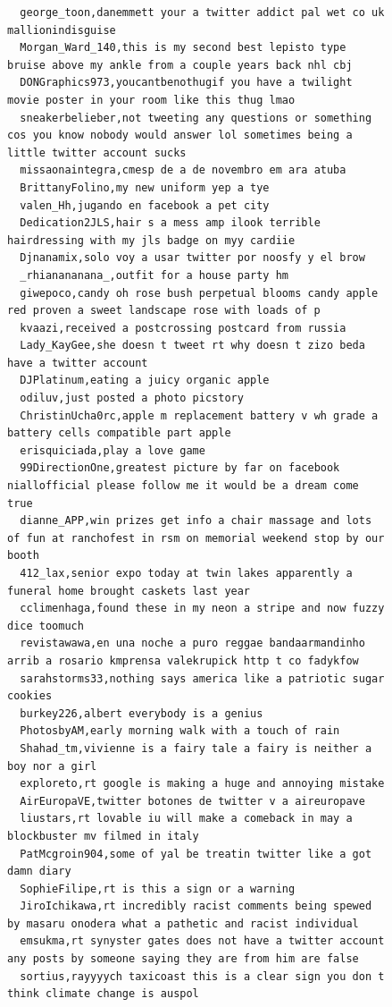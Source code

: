 \begin{figure}[htpb]
\begin{verbatim}
  george_toon,danemmett your a twitter addict pal wet co uk mallionindisguise
  Morgan_Ward_140,this is my second best lepisto type bruise above my ankle from a couple years back nhl cbj
  DONGraphics973,youcantbenothugif you have a twilight movie poster in your room like this thug lmao
  sneakerbelieber,not tweeting any questions or something cos you know nobody would answer lol sometimes being a little twitter account sucks
  missaonaintegra,cmesp de a de novembro em ara atuba
  BrittanyFolino,my new uniform yep a tye
  valen_Hh,jugando en facebook a pet city
  Dedication2JLS,hair s a mess amp ilook terrible hairdressing with my jls badge on myy cardiie
  Djnanamix,solo voy a usar twitter por noosfy y el brow
  _rhianananana_,outfit for a house party hm
  giwepoco,candy oh rose bush perpetual blooms candy apple red proven a sweet landscape rose with loads of p
  kvaazi,received a postcrossing postcard from russia
  Lady_KayGee,she doesn t tweet rt why doesn t zizo beda have a twitter account
  DJPlatinum,eating a juicy organic apple
  odiluv,just posted a photo picstory
  ChristinUcha0rc,apple m replacement battery v wh grade a battery cells compatible part apple
  erisquiciada,play a love game
  99DirectionOne,greatest picture by far on facebook niallofficial please follow me it would be a dream come true
  dianne_APP,win prizes get info a chair massage and lots of fun at ranchofest in rsm on memorial weekend stop by our booth
  412_lax,senior expo today at twin lakes apparently a funeral home brought caskets last year
  cclimenhaga,found these in my neon a stripe and now fuzzy dice toomuch
  revistawawa,en una noche a puro reggae bandaarmandinho arrib a rosario kmprensa valekrupick http t co fadykfow
  sarahstorms33,nothing says america like a patriotic sugar cookies
  burkey226,albert everybody is a genius
  PhotosbyAM,early morning walk with a touch of rain
  Shahad_tm,vivienne is a fairy tale a fairy is neither a boy nor a girl
  exploreto,rt google is making a huge and annoying mistake
  AirEuropaVE,twitter botones de twitter v a aireuropave
  liustars,rt lovable iu will make a comeback in may a blockbuster mv filmed in italy
  PatMcgroin904,some of yal be treatin twitter like a got damn diary
  SophieFilipe,rt is this a sign or a warning
  JiroIchikawa,rt incredibly racist comments being spewed by masaru onodera what a pathetic and racist individual
  emsukma,rt synyster gates does not have a twitter account any posts by someone saying they are from him are false
  sortius,rayyyych taxicoast this is a clear sign you don t think climate change is auspol

\end{verbatim}
\end{figure}
